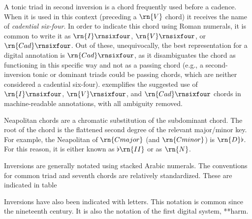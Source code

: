A tonic triad in second inversion is a chord frequently used
before a cadence. When it is used in this context (preceding
a $\rn{V}$ chord) it receives the name of \emph{cadential
six-four}. In order to indicate this chord using Roman
numerals, it is common to write it as $\rn{I}\rnsixfour$,
$\rn{V}\rnsixfour$, or $\rn{Cad}\rnsixfour$. Out of these,
unequivocally, the best representation for a digital
annotation is $\rn{Cad}\rnsixfour$, as it disambiguates the
chord as functioning in this specific way and not as a
passing chord (e.g., a second-inversion tonic or dominant
triads could be passing chords, which are neither considered
a cadential six-four). 
exemplifies the suggested use of $\rn{I}\rnsixfour$,
$\rn{V}\rnsixfour$, and $\rn{Cad}\rnsixfour$ chords in
machine-readable annotations, with all ambiguity removed.

Neapolitan chords are a chromatic substitution of the
subdominant chord. The root of the chord is the flattened
second degree of the relevant major/minor key. For example,
the Neapolitan of $\rn{C major}$ (and $\rn{C minor}$) is
$\rn{D}\flat$. For this reason, it is either known as
$\flat\rn{II}$ or as $\rn{N}$.

Inversions are generally notated using stacked Arabic
numerals. The conventions for common triad and seventh
chords are relatively standardized. These are indicated in table 



Inversions have also been indicated with letters. This
notation is common since the nineteenth century. It is also
the notation of the first digital system, **harm.
